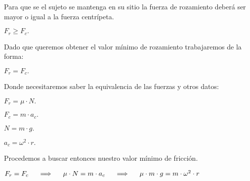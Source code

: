 \documentclass[a4paper,12pt]{article} %
\begin{document}
\newpage


\begin{justify}
    Para que se el sujeto se mantenga en su sitio la fuerza de rozamiento deberá ser mayor o igual a la fuerza centrípeta.
\end{justify}


\begin{center}
    \(F_r \geq  F_c.\)
\end{center}

\vspace{\baselineskip}


\begin{justify}
    Dado que queremos obtener el valor mínimo de rozamiento trabajaremos de la forma:
\end{justify}

\begin{center}
    \(F_r = F_c.\)
\end{center}

\vspace{\baselineskip}

\begin{justify}
    Donde necesitaremos saber la equivalencia de las fuerzas y otros datos:
\end{justify}

\begin{multicols}{4}
    \(F_r = \mu \cdot N. \)

    \columnbreak

    \(F_c = m \cdot a_c.\)

    \columnbreak

    \(N = m \cdot g.\)

    \columnbreak

    \(a_c = \omega^2 \cdot r. \)
\end{multicols}

\vspace{\baselineskip}

\begin{justify}
    Procedemos a buscar entonces nuestro valor mínimo de fricción.
\end{justify}

\(F_r = F_c \hspace{0.5 cm}  \Longrightarrow \hspace{0.5 cm}  \mu \cdot N = m \cdot a_c  \hspace{0.5 cm}  \Longrightarrow \hspace{0.5 cm} \mu \cdot m \cdot g = m \cdot \omega^2 \cdot r \)
\end{document}
